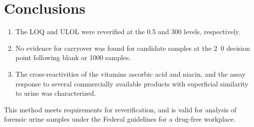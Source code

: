 \documentclass[article,11pt,oneside]{memoir}
\begin{document}
\chapter{Conclusions}
\begin{enumerate}
\item The LOQ and ULOL were reverified at the 0.5 and \unit{300}{\milli\gram\per\deci\liter} levels, respectively.
\item No evidence for carryover was found for candidate samples at the \unit{2.0}{\milli\gram\per\deci\liter} decision point following blank or \unit{1000}{\milli\gram\per\deci\liter} samples.
\item The cross-reactivities of the vitamins ascorbic acid and niacin, and the assay response to several commercially available products with superficial similarity to urine was characterized.
\end{enumerate}
This method meets requirements for reverification, and is valid for analysis of forensic urine samples under the Federal guidelines for a drug-free workplace.


\end{document}
